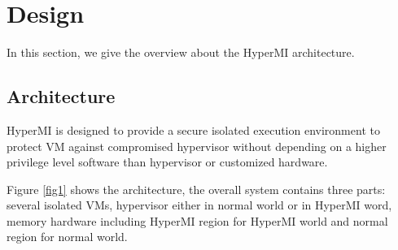 \documentclass[conference]{IEEEtran}
\begin{document}

\section{Design}
In this section, we give the overview about the HyperMI architecture.%


\subsection{Architecture} 

HyperMI is designed to provide a secure isolated execution environment to protect VM against compromised hypervisor without depending on a higher privilege level software than hypervisor or customized hardware.

Figure \ref{fig1} shows the architecture, the overall system contains three parts: several isolated VMs, hypervisor either in normal world or in HyperMI word, memory hardware including HyperMI region for HyperMI world and normal region for normal world.
\end{document}
